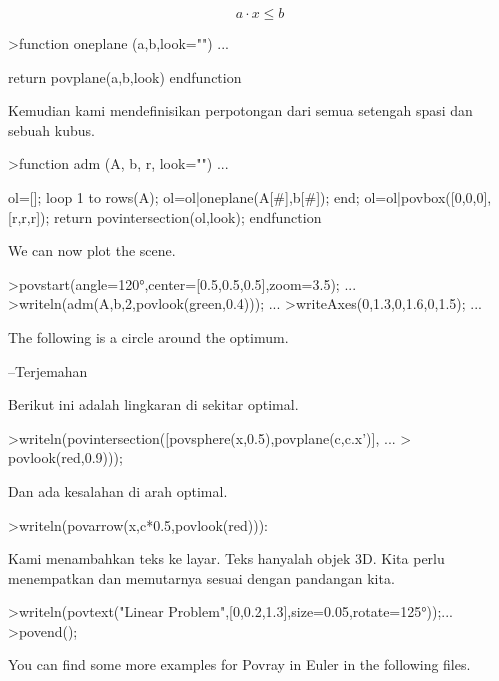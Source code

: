 \documentclass[a4paper,10pt]{article}
\begin{document}
\begin{eulernotebook}
\begin{eulercomment}
\begin{eulercomment}
\begin{eulercomment}
\end{eulercomment}
\begin{eulerformula}
\[
a \cdot x \le b
\]
\end{eulerformula}
\begin{eulerprompt}
>function oneplane (a,b,look="") ...
\end{eulerprompt}
\begin{eulerudf}
    return povplane(a,b,look)
  endfunction
\end{eulerudf}
\begin{eulercomment}
Kemudian kami mendefinisikan perpotongan dari semua setengah spasi dan
sebuah kubus.
\end{eulercomment}
\begin{eulerprompt}
>function adm (A, b, r, look="") ...
\end{eulerprompt}
\begin{eulerudf}
    ol=[];
    loop 1 to rows(A); ol=ol|oneplane(A[#],b[#]); end;
    ol=ol|povbox([0,0,0],[r,r,r]);
    return povintersection(ol,look);
  endfunction
\end{eulerudf}
\begin{eulercomment}
We can now plot the scene.
\end{eulercomment}
\begin{eulerprompt}
>povstart(angle=120°,center=[0.5,0.5,0.5],zoom=3.5); ...
>writeln(adm(A,b,2,povlook(green,0.4))); ...
>writeAxes(0,1.3,0,1.6,0,1.5); ...
\end{eulerprompt}
\begin{eulercomment}
The following is a circle around the optimum.

--Terjemahan

Berikut ini adalah lingkaran di sekitar optimal.
\end{eulercomment}
\begin{eulerprompt}
>writeln(povintersection([povsphere(x,0.5),povplane(c,c.x')], ...
>  povlook(red,0.9)));
\end{eulerprompt}
\begin{eulercomment}
Dan ada kesalahan di arah optimal.
\end{eulercomment}
\begin{eulerprompt}
>writeln(povarrow(x,c*0.5,povlook(red))):
\end{eulerprompt}
\begin{eulercomment}
Kami menambahkan teks ke layar. Teks hanyalah objek 3D. Kita perlu
menempatkan dan memutarnya sesuai dengan pandangan kita.
\end{eulercomment}
\begin{eulerprompt}
>writeln(povtext("Linear Problem",[0,0.2,1.3],size=0.05,rotate=125°));...
>povend();
\end{eulerprompt}
\begin{eulercomment}
You can find some more examples for Povray in Euler in the following
files.


\end{eulercomment}
\end{eulercomment}
\end{eulercomment}
\end{eulernotebook}
\end{document}
